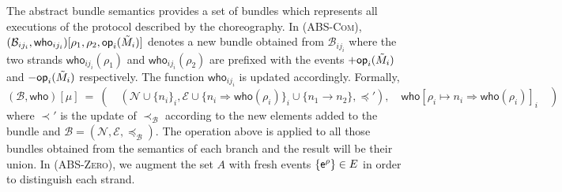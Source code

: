 \documentclass[copyright]{eptcs}
\newcommand{\who}{\mathsf{who}}
\newcommand{\Did}[1]{(\textsc{#1})}
\newcommand{\NI}{\noindent}
\newcommand{\op}[1]{{\sf #1}}
\begin{document}
\NI The abstract bundle semantics provides a set of bundles which
represents all executions of the protocol described by the
choreography.  In \Did{ABS-Com}, $(\mathcal
B_{ij_i},\who_{ij_i})[\rho_1,\rho_2,\op{op}_i(\tilde M_i)]$ denotes a
new bundle obtained from $\mathcal B_{ij_i}$ where the two strands
$\who_{ij_i}(\rho_1)$ and $\who_{ij_i}(\rho_2)$ are prefixed with the
events $+\op{op}_i(\tilde M_i)$ and $-\op{op}_i(\tilde M_i)$
respectively. The function $\who_{ij_i}$ is updated
accordingly. Formally, 
\begin{equation*}
  (\mathcal B,\who)[\mu]\ = \
  (\quad
  (
  \mathcal N\cup\{n_i\}_i,
  \mathcal E\cup\{n_i\Rightarrow \who(\rho_i)\}_{i}\cup\{n_1\rightarrow n_2\},
  \preceq'
  ),\quad
  \who[\rho_i\mapsto n_i\Rightarrow \who(\rho_i)]_i
  \quad)
\end{equation*}
where $\prec'$ is the update of $\prec_{\mathcal B}$ according to the
new elements added to the bundle and $\mathcal B=(\mathcal N,\mathcal
E,\preceq_{\mathcal B})$. The operation above is applied to all those
bundles obtained from the semantics of each branch and the result will
be their union. In \Did{ABS-Zero}, we augment the set $A$ with fresh
events $\{\op e^\rho\}\in E$ in order to distinguish each strand.
\end{document}
